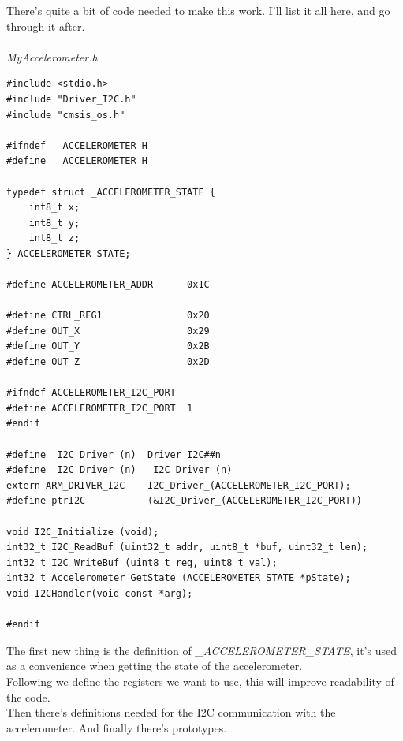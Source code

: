 \documentclass{article}
\begin{document}
There's quite a bit of code needed to make this work. I'll list it all here,
and go through it after.\\
\\
\textit{MyAccelerometer.h}
\begin{lstlisting}
#include <stdio.h>
#include "Driver_I2C.h"
#include "cmsis_os.h"

#ifndef __ACCELEROMETER_H
#define __ACCELEROMETER_H

typedef struct _ACCELEROMETER_STATE {
    int8_t x;
    int8_t y;
    int8_t z;
} ACCELEROMETER_STATE;

#define ACCELEROMETER_ADDR 		0x1C

#define CTRL_REG1             	0x20
#define OUT_X                 	0x29
#define OUT_Y                 	0x2B
#define OUT_Z                 	0x2D

#ifndef ACCELEROMETER_I2C_PORT
#define ACCELEROMETER_I2C_PORT 	1
#endif

#define _I2C_Driver_(n)  Driver_I2C##n
#define  I2C_Driver_(n)  _I2C_Driver_(n)
extern ARM_DRIVER_I2C    I2C_Driver_(ACCELEROMETER_I2C_PORT);
#define ptrI2C           (&I2C_Driver_(ACCELEROMETER_I2C_PORT))

void I2C_Initialize (void);
int32_t I2C_ReadBuf (uint32_t addr, uint8_t *buf, uint32_t len);
int32_t I2C_WriteBuf (uint8_t reg, uint8_t val);
int32_t Accelerometer_GetState (ACCELEROMETER_STATE *pState);
void I2CHandler(void const *arg);

#endif
\end{lstlisting}
The first new thing is the definition of \textit{\_ACCELEROMETER\_STATE}, it's
used as a convenience when getting the state of the accelerometer.\\
Following we define the registers we want to use, this will improve readability
of the code.\\
Then there's definitions needed for the I2C communication with the accelerometer.
And finally there's prototypes.
\end{document}
